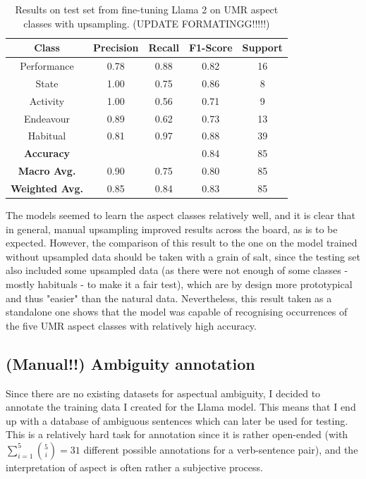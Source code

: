 \begin{table}
    \centering
    \begin{tabular}{|c|c|c|c|c|}\hline
        \textbf{Class} & \textbf{Precision} & \textbf{Recall} & \textbf{F1-Score} & \textbf{Support} \\ \hline
        Performance & 0.78 & 0.88 & 0.82 & 16\\ \hline
        State & 1.00 & 0.75 & 0.86 & 8\\\hline
        Activity & 1.00 & 0.56 & 0.71 & 9\\\hline
        Endeavour & 0.89 & 0.62 & 0.73 & 13\\\hline
        Habitual & 0.81 & 0.97 & 0.88 & 39\\ \hline \hline
        \textbf{Accuracy} &  &  & 0.84 & 85 \\ \hline
        \textbf{Macro Avg.} & 0.90  & 0.75 & 0.80 & 85 \\ \hline
        \textbf{Weighted Avg.} & 0.85  & 0.84 & 0.83 & 85 \\ \hline

    \end{tabular}
    \caption{Results on test set from fine-tuning Llama 2 on UMR aspect classes with upsampling. (UPDATE FORMATINGG!!!!!)}
\end{table}
\label{llama_results_upsampling}

The models seemed to learn the aspect classes relatively well, and it is clear that in general, manual upsampling improved results across the board, as is to be expected. However, the comparison of this result to the one on the model trained without upsampled data should be taken with a grain of salt, since the testing set also included some upsampled data (as there were not enough of some classes - mostly habituals - to make it a fair test), which are by design more prototypical and thus "easier" than the natural data. Nevertheless, this result taken as a standalone one shows that the model was capable of recognising occurrences of the five UMR aspect classes with relatively high accuracy.

\subsection{(Manual!!) Ambiguity annotation}
\label{sect:manual_amb_annotation}
Since there are no existing datasets for aspectual ambiguity, I decided to annotate the training data I created for the Llama model. This means that I end up with a database of ambiguous sentences which can later be used for testing. This is a relatively hard task for annotation since it is rather open-ended (with $\sum_{i=1}^{5} \binom{5}{i}=31$ different possible annotations for a verb-sentence pair), and the interpretation of aspect is often rather a subjective process.

